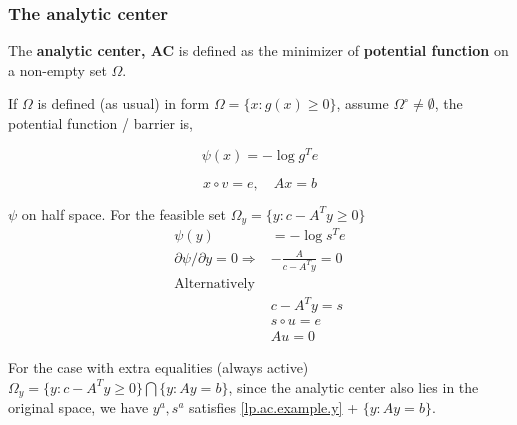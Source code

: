 \documentclass[main]{subfiles}
\begin{document}
\subsubsection{The analytic center}

The \textbf{analytic center, AC} is defined as the minimizer of \textbf{potential function} on a non-empty set \(\Omega\).

If \(\Omega\) is defined (as usual) in form \(\Omega = \{x :  g(x) \ge 0\}\), assume \(\Omega^\circ \neq \emptyset\), the potential function / barrier is,

\begin{equation}
    \psi(x) = - \log g^Te
\end{equation}



\begin{equation}
    x \circ v = e, \quad Ax = b
\end{equation}
\begin{example}
    \(\psi\) on half space.  For the feasible set \(\Omega_y = \{y: c - A^Ty \ge 0\}\)
    \begin{equation}\label{lp.ac.example.y}
        \begin{aligned}
            \psi(y)                                    & = -  \log s ^T e        \\
            \partial \psi / \partial y = 0 \Rightarrow & - \frac{A}{c- A^Ty} = 0 \\
            \textrm{Alternatively}                     &                         \\
                                                       & c- A^Ty = s             \\
                                                       & s \circ u = e           \\
                                                       & Au = 0
        \end{aligned}
    \end{equation}
\end{example}
For the case with extra equalities (always active) \(\Omega_y = \{y: c - A^Ty \ge 0\} \bigcap \{y: Ay = b\}\), since the analytic center also lies in the original space, we have \(y^a, s^a\) satisfies \eqref{lp.ac.example.y} + \(\{y: Ay = b\}\).
\end{document}

